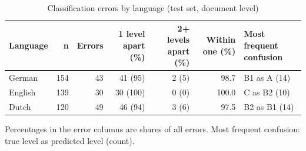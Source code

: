 \begin{table}[htbp]
\centering
\small
\begin{threeparttable}
\caption{Classification errors by language (test set, document level)}
\label{tab:clf-errors-doc}
\begin{tabular}{lrrrrrl}
\hline
Language & n & Errors & 1 level apart (\%) & 2+ levels apart (\%) & Within one (\%) & Most frequent confusion \\
\hline
German & 154 & 43 & 41 (95) & 2 (5) & 98.7 & B1 as A (14) \\
English & 139 & 30 & 30 (100) & 0 (0) & 100.0 & C as B2 (10) \\
Dutch & 120 & 49 & 46 (94) & 3 (6) & 97.5 & B2 as B1 (14) \\
\hline
\end{tabular}
\begin{tablenotes}
\footnotesize
\item Percentages in the error columns are shares of all errors. Most frequent confusion: true level as predicted level (count).
\end{tablenotes}
\end{threeparttable}
\end{table}
